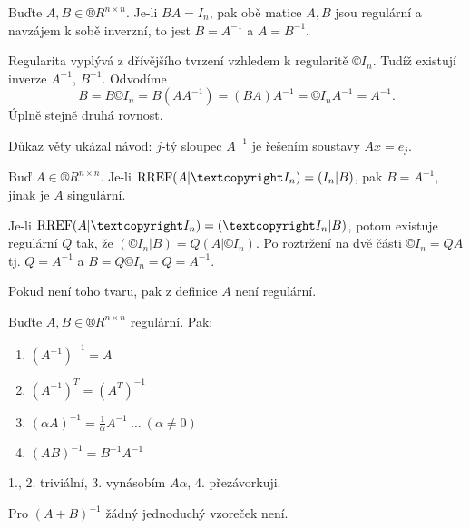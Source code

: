\documentclass[12pt]{article}					%
\begin{document}
    \begin{veta}
        Buďte $A, B \in ®R^{n\times n}$. Je-li $BA = I_n$, pak obě matice $A, B$ jsou regulární a navzájem k sobě inverzní, to jest $B = A^{-1}$ a $A = B^{-1}$.
        \begin{dukazin}
                Regularita vyplývá z dřívějšího tvrzení vzhledem k regularitě $©I_n$. Tudíž existují inverze $A^{-1}$, $B^{-1}$. Odvodíme
                $$ B = B©I_n = B(AA^{-1}) = (BA)A^{-1} = ©I_nA^{-1} = A^{-1}. $$
                Úplně stejně druhá rovnost.
        \end{dukazin}
    \end{veta}

    \begin{poznamka}
        Důkaz věty ukázal návod: $j$-tý sloupec $A^{-1}$ je řešením soustavy $Ax = e_j$.
    \end{poznamka}

    \begin{veta}
        Buď $A \in ®R^{n\times n}$. Je-li $\RREF(A|©I_n) = (I_n|B)$, pak $B = A^{-1}$, jinak je $A$ singulární.
        \begin{dukazin}
            Je-li $\RREF(A| ©I_n) = (©I_n | B)$, potom existuje regulární $Q$ tak, že $(©I_n|B) = Q(A|©I_n)$. Po roztržení na dvě části $©I_n = QA$ tj. $Q = A^{-1}$ a $B = Q©I_n = Q = A^{-1}$.

            Pokud není toho tvaru, pak z definice $A$ není regulární.
        \end{dukazin}
    \end{veta}

    \begin{tvrzeni}
        Buďte $A, B \in ®R^{n\times n}$ regulární. Pak:
        \begin{enumerate}
            \item $(A^{-1})^{-1} = A$
            \item $(A^{-1})^T = (A^T)^{-1}$
            \item $(\alpha A)^{-1} = \frac{1}{\alpha} A^{-1}\ …\ (\alpha≠0)$
            \item $(AB)^{-1} = B^{-1}A^{-1}$
        \end{enumerate}
        \begin{dukazin}
            1., 2. triviální, 3. vynásobím $A\alpha$, 4. přezávorkuji.
        \end{dukazin}
        \begin{poznamkain}
            Pro $(A+B)^{-1}$ žádný jednoduchý vzoreček není.
        \end{poznamkain}
    \end{tvrzeni}
    
\end{document}
